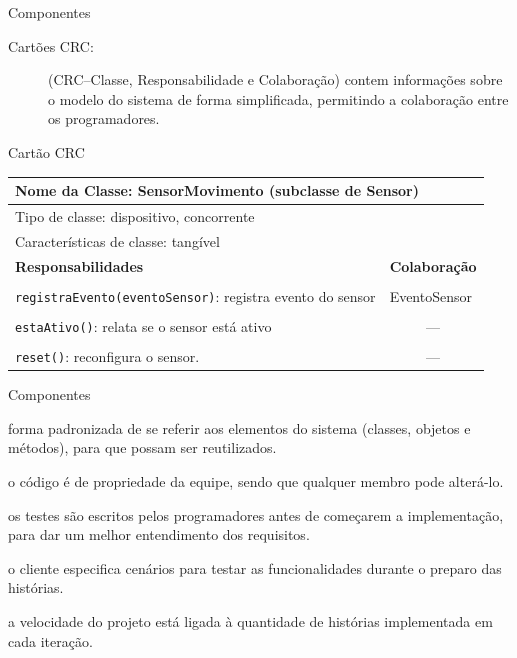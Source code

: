\begin{frame}{Componentes}{\insertlecture}
  \begin{description}
  \item[Cartões CRC:] (CRC--Classe, Responsabilidade e Colaboração)
    contem informações sobre o modelo do sistema de forma
    simplificada, permitindo a colaboração entre os programadores.

  \end{description}
  \footnotesize
    Cartão CRC \\ 
  \begin{tabular}[h]{|lll|}\hline
    \multicolumn{3}{|l|}{{\bf Nome da Classe:} SensorMovimento (subclasse de Sensor)}\\\hline
    \multicolumn{3}{|l|}{Tipo de classe: dispositivo, concorrente}\\ \hline
    \multicolumn{3}{|l|}{Características de classe: tangível}\\ \hline
    \multicolumn{2}{|l|}{\bf Responsabilidades} & \multicolumn{1}{|l|}{\bf Colaboração}\\
    \multicolumn{2}{|l|}{} & \multicolumn{1}{|l|}{}\\                                         
    \multicolumn{2}{|l|}{{\tt registraEvento(eventoSensor)}: registra evento do sensor} & \multicolumn{1}{|l|}{EventoSensor}\\
    \multicolumn{2}{|l|}{} & \multicolumn{1}{|l|}{}\\                                         
    \multicolumn{2}{|l|}{{\tt estaAtivo()}: relata se o sensor está ativo} & \multicolumn{1}{|c|}{---}\\
    \multicolumn{2}{|l|}{} & \multicolumn{1}{|l|}{}\\                                         
   \multicolumn{2}{|l|}{{\tt reset()}: reconfigura o sensor.} & \multicolumn{1}{|c|}{---}\\\hline
  \end{tabular}
\end{frame}

\begin{frame}{Componentes}{\insertlecture}
  \begin{description}[<+-| alert@+>]
  \item[Metáfora do sistema:] forma padronizada de se referir aos elementos do 
    sistema (classes, objetos e métodos), para que possam ser reutilizados.
  \item[Propriedade coletiva do código:] o código é de propriedade da equipe, 
    sendo que qualquer membro pode alterá-lo.
  \item[Teste de unidade:] os testes são escritos pelos programadores 
    antes de começarem a implementação, para dar um melhor entendimento 
    dos requisitos.
  \item[Teste de aceitação:] o cliente especifica cenários para testar 
    as funcionalidades durante o preparo das histórias.
  \item[Velocidade:] a velocidade do projeto está ligada à 
    quantidade de histórias implementada em cada iteração.
  \end{description}
\end{frame}

